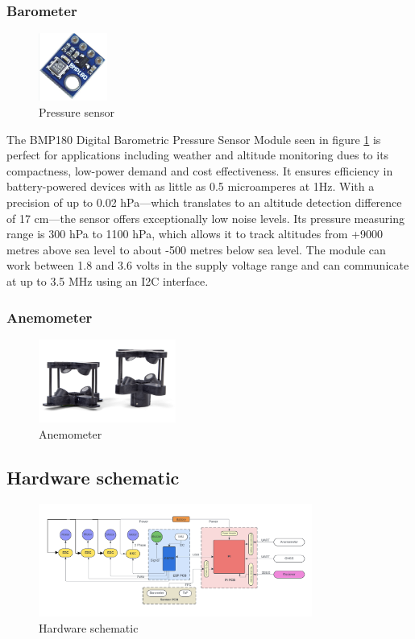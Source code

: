 \documentclass{article}
\begin{document}
\subsubsection{Barometer}
\begin{figure}[H]
  \centering
  \includegraphics[width=0.2\textwidth]{Pictures/bmp180.png}
  \caption{Pressure sensor}
  \label{fig:bmp180}
\end{figure}
The BMP180 Digital Barometric Pressure Sensor Module seen in figure \ref{fig:bmp180} is perfect for applications including weather and altitude monitoring dues to its compactness, low-power demand and cost effectiveness. It ensures efficiency in battery-powered devices with as little as 0.5 microamperes at 1Hz. With a precision of up to 0.02 hPa—which translates to an altitude detection difference of 17 cm—the sensor offers exceptionally 
low noise levels. Its pressure measuring range is 300 hPa to 1100 hPa, which allows it to track altitudes from +9000 metres above sea level to about -500 metres below sea level. The module can work between 1.8 and 3.6 volts in the supply voltage range and can communicate at up to 3.5 MHz using an I2C interface.

\subsubsection{Anemometer}
\begin{figure}[H]
  \centering
  \includegraphics[width=0.4\textwidth]{Pictures/Anemometer.png}
  \caption{Anemometer}
  \label{fig:Anemometer}
\end{figure}

\subsection{Hardware schematic}
\begin{figure}[H]
  \centering
  \includegraphics[width=0.8\textwidth]{Pictures/Hardware_schematic.png}
  \caption{Hardware schematic}
  \label{fig:hardware_schematic}
\end{figure}
\end{document}

